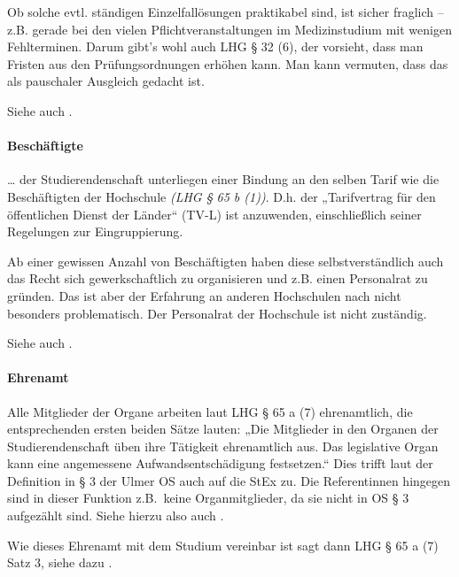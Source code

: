 \documentclass[
10pt,
a4paper,
twoside,								%
titlepage=false,							%
draft=false								%
]{scrartcl}
\begin{document}
Ob solche evtl. ständigen Einzelfallösungen praktikabel sind, ist sicher fraglich – z.B. gerade bei den vielen Pflichtveranstaltungen im Medizinstudium mit wenigen Fehlterminen. Darum gibt's wohl auch LHG § 32 (6), der vorsieht, dass man Fristen aus den Prüfungsordnungen erhöhen kann. Man kann vermuten, dass das als pauschaler Ausgleich gedacht ist.

Siehe auch .



\paragraph{Beschäftigte}\label{Glossar: Beschäftigte}

… der Studierendenschaft unterliegen einer Bindung an den selben Tarif wie die Beschäftigten der Hochschule \textit{(LHG § 65 b (1))}. D.h. der „Tarifvertrag für den öffentlichen Dienst der Länder“ (TV-L) ist anzuwenden, einschließlich seiner Regelungen zur Eingruppierung.

Ab einer gewissen Anzahl von Beschäftigten haben diese selbstverständlich auch das Recht sich gewerkschaftlich zu organisieren und z.B. einen Personalrat zu gründen. Das ist aber der Erfahrung an anderen Hochschulen nach nicht besonders problematisch. Der Personalrat der Hochschule ist nicht zuständig.

Siehe auch .



\paragraph{Ehrenamt}\label{Glossar: Ehrenamt}

Alle Mitglieder der Organe arbeiten laut LHG § 65 a (7) ehrenamtlich, die entsprechenden ersten beiden Sätze lauten: „Die Mitglieder in den Organen der Studierendenschaft üben ihre Tätigkeit ehrenamtlich aus. Das legislative Organ kann eine angemessene Aufwandsentschädigung festsetzen.“ Dies trifft laut der Definition in § 3 der Ulmer OS auch auf die StEx zu. Die Referentinnen hingegen sind in dieser Funktion z.B.~keine Organmitglieder, da sie nicht in OS § 3 aufgezählt sind. Siehe hierzu also auch .

Wie dieses Ehrenamt mit dem Studium vereinbar ist sagt dann LHG § 65 a (7) Satz 3, siehe dazu .
\end{document}
